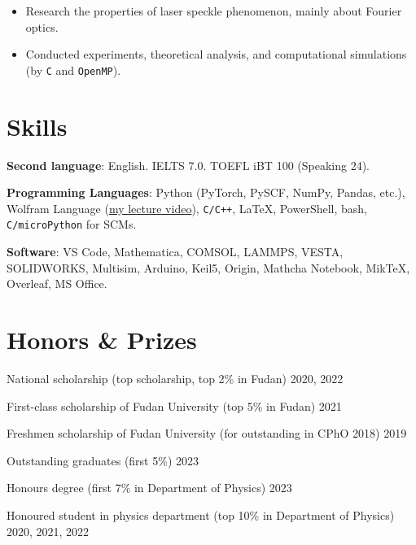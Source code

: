 \documentclass[11pt]{article} %
\begin{document}
\begin{itemize}
    \item Research the properties of laser speckle phenomenon, mainly about Fourier optics.
    \item Conducted experiments, theoretical analysis, and computational simulations (by \verb|C| and \verb|OpenMP|).
\end{itemize}



\section*{Skills}

\textbf{Second language}: English. IELTS 7.0. TOEFL iBT 100 (Speaking 24).

\textbf{Programming Languages}:
Python (PyTorch, PySCF, NumPy, Pandas, etc.), Wolfram Language (\href{https://www.bilibili.com/video/BV1uA4y1X7tU/}{my lecture video}), \verb|C/C++|, \LaTeX, PowerShell, bash, \verb|C/microPython| for SCMs.

\textbf{Software}:
VS Code, Mathematica, COMSOL, LAMMPS, VESTA, SOLIDWORKS, Multisim, Arduino, Keil5, Origin, Mathcha Notebook, MikTeX, Overleaf, MS Office.



\section*{Honors \& Prizes}

National scholarship (top scholarship, top 2\% in Fudan)
\hfill 2020, 2022

First-class scholarship of Fudan University (top 5\% in Fudan)
\hfill 2021

Freshmen scholarship of Fudan University (for outstanding in CPhO 2018)
\hfill 2019

\vspace{2ex}


Outstanding graduates (first 5\%)
\hfill 2023

Honours degree (first 7\% in Department of Physics)
\hfill 2023

Honoured student in physics department (top 10\% in Department of Physics)
\hfill 2020, 2021, 2022

\vspace{2ex}
\end{document}
